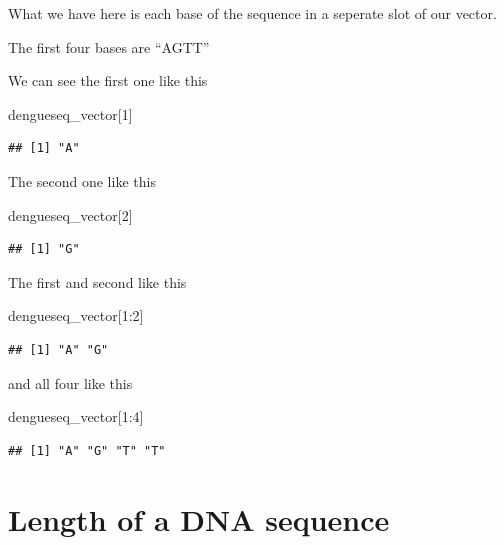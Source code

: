\documentclass[
]{book}
\newenvironment{Shaded}{\begin{snugshade}}{\end{snugshade}}
\newcommand{\DecValTok}[1]{\textcolor[rgb]{0.00,0.00,0.81}{#1}}
\newcommand{\NormalTok}[1]{#1}
\newcommand{\SpecialCharTok}[1]{\textcolor[rgb]{0.00,0.00,0.00}{#1}}
\begin{document}
What we have here is each base of the sequence in a seperate slot of our vector.

The first four bases are ``AGTT''

We can see the first one like this

\begin{Shaded}
\begin{Highlighting}[]
\NormalTok{dengueseq\_vector[}\DecValTok{1}\NormalTok{]}
\end{Highlighting}
\end{Shaded}

\begin{verbatim}
## [1] "A"
\end{verbatim}

The second one like this

\begin{Shaded}
\begin{Highlighting}[]
\NormalTok{dengueseq\_vector[}\DecValTok{2}\NormalTok{]}
\end{Highlighting}
\end{Shaded}

\begin{verbatim}
## [1] "G"
\end{verbatim}

The first and second like this

\begin{Shaded}
\begin{Highlighting}[]
\NormalTok{dengueseq\_vector[}\DecValTok{1}\SpecialCharTok{:}\DecValTok{2}\NormalTok{]}
\end{Highlighting}
\end{Shaded}

\begin{verbatim}
## [1] "A" "G"
\end{verbatim}

and all four like this

\begin{Shaded}
\begin{Highlighting}[]
\NormalTok{dengueseq\_vector[}\DecValTok{1}\SpecialCharTok{:}\DecValTok{4}\NormalTok{]}
\end{Highlighting}
\end{Shaded}

\begin{verbatim}
## [1] "A" "G" "T" "T"
\end{verbatim}

\hypertarget{length-of-a-dna-sequence}{%
\section{Length of a DNA sequence}\label{length-of-a-dna-sequence}}
\end{document}
